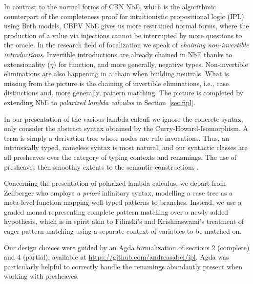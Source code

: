 \documentclass[sigplan,screen]{acmart}
\begin{document}
In contrast to the normal forms of CBN NbE, which is the algorithmic
counterpart of the completeness proof for intuitionistic propositional
logic (IPL) using Beth models, CBPV NbE gives us more restrained
normal forms, where the production of a value via injections cannot be
interrupted by more questions to the oracle.  In the research field of
focalization \cite{andreoli:focusing,liangMiller:csl07} we speak of
\emph{chaining non-invertible introductions}.
Invertible introductions are already chained in NbE thanks to
extensionality ($\eta$) for function, and more generally, negative
types.  Non-invertible eliminations are also happening in a chain when
building neutrals.  What is missing from the picture is the chaining
of invertible eliminations, i.e., case distinctions and, more
generally, pattern matching.  The picture is completed by extending
NbE to \emph{polarized lambda calculus}
\cite{zeilberger:PhD,brockNannestadSchuermann:lpar10,espiritoSanto:entcs17}
in Section~\ref{sec:fipl}.


In our presentation of the various lambda calculi we ignore the
concrete syntax, only consider the abstract syntax obtained by the
Curry-Howard-Isomorphism.  A term is simply a derivation tree whose
nodes are rule invocations.  Thus, an intrinsically typed,
nameless syntax is most natural,
and our syntactic classes are all presheaves over the category of
typing contexts and renamings.  The use of presheaves then smoothly
extents to the semantic constructions
\cite{catarina:csl93,altenkirchHofmannStreicher:ctcs95}.

Concerning the presentation of polarized lambda calculus, we depart from
Zeilberger \cite{zeilberger:PhD} who employs \emph{a priori}
infinitary syntax, modelling a case tree as a meta-level function mapping
well-typed patterns to branches.  Instead, we use a graded monad
representing complete pattern matching over a newly added hypothesis,
which is in spirit akin to Filinski's \cite[Section~4]{filinski:tlca01}
and Krishnaswami's \cite{krishnaswami:popl09} treatment of eager
pattern matching using a separate context of variables to be matched
on.

Our design choices were guided by an Agda formalization of sections 2
(complete) and 4 (partial), available at \url{https://github.com/andreasabel/ipl}.
Agda was particularly helpful to correctly handle the renamings
abundantly present when working with presheaves.

\end{document}
